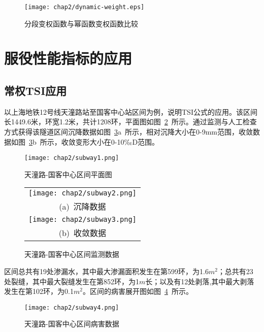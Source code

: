 \begin{figure}[htbp]
    \centering
    \texttt{[image: chap2/dynamic-weight.eps]}
    \caption{分段变权函数与幂函数变权函数比较}
    \label{fig:分段变权函数与幂函数变权函数比较}
\end{figure}

\section{服役性能指标的应用}

\subsection{常权TSI应用}

以上海地铁12号线天潼路站至国客中心站区间为例，说明TSI公式的应用。该区间长1449.6米，环宽1.2米，共计1208环，平面图如图~\ref{fig:天潼路-国客中心区间平面图}~所示。通过监测与人工检查方式获得该隧道区间沉降数据如图~\ref{fig:天潼路-国客中心区间监测数据}a~所示，相对沉降大小在0-9mm范围，收敛数据如图~\ref{fig:天潼路-国客中心区间监测数据}b~所示，收敛变形大小在0-10‰D范围。

\begin{figure}[htb!]
    \centering
    \texttt{[image: chap2/subway1.png]}
    \caption{天潼路-国客中心区间平面图}
    \label{fig:天潼路-国客中心区间平面图}
\end{figure}

\begin{figure}[htb!] 
    \centering 
    \begin{tabular}{c} 
        \texttt{[image: chap2/subway2.png]} \\ 
        (a)~沉降数据 \\
        \texttt{[image: chap2/subway3.png]} \\ 
        (b)~收敛数据 \\
    \end{tabular}
    \caption{天潼路-国客中心区间监测数据} 
    \label{fig:天潼路-国客中心区间监测数据} 
\end{figure}

区间总共有19处渗漏水，其中最大渗漏面积发生在第599环，为1.6$m^2$；总共有23处裂缝，其中最大裂缝发生在第852环，为1$m$长；以及有12处剥落,其中最大剥落发生在第102环，为0.1$m^2$。区间的病害展开图如图~\ref{fig:天潼路-国客中心区间病害数据}~所示。

\begin{figure}[htb!]
    \centering
    \texttt{[image: chap2/subway4.png]}
    \caption{天潼路-国客中心区间病害数据}
    \label{fig:天潼路-国客中心区间病害数据}
\end{figure}


